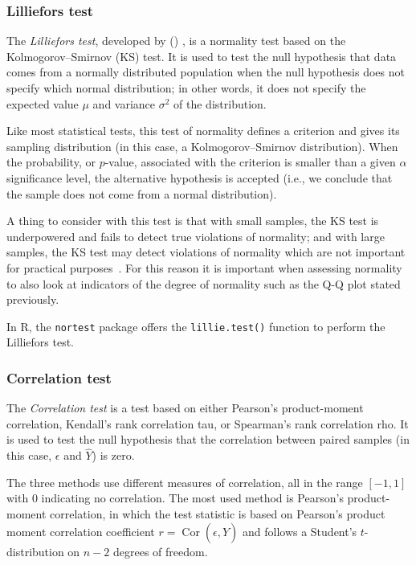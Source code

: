 \subsubsection{Lilliefors test}\label{sec:diag-lillie}
The \emph{Lilliefors test}, developed by \citeauthor{Lilliefors1967} (\citeyear{Lilliefors1967}) \cite{Lilliefors1967}, is  a normality test based on the Kolmogorov--Smirnov (KS) test. It is used to test the null hypothesis that data comes from a normally distributed population when the null hypothesis does not specify which normal distribution; in other words, it does not specify the expected value $\mu$ and variance $\sigma^{2}$ of the distribution.

Like most statistical tests, this test of normality defines a criterion and gives its sampling distribution (in this case, a Kolmogorov--Smirnov distribution). When the probability, or $p$-value, associated with the criterion is smaller than a given $\alpha$ significance level, the alternative hypothesis is accepted (i.e., we conclude that the sample does not come from a normal distribution).

A thing to consider with this test is that with small samples, the KS test is underpowered and fails to detect true violations of normality; and with large samples, the KS test may detect violations of normality which are not important for practical purposes~\cite{Razali2010}. For this reason it is important when assessing normality to also look at indicators of the degree of normality such as the Q-Q plot stated previously.

\medskip
In R, the \texttt{nortest} package offers the \texttt{lillie.test()} function to perform the Lilliefors test.

\subsubsection{Correlation test}\label{sec:diag-covtest}
The \emph{Correlation test} is a test based on either Pearson's product-moment correlation, Kendall's rank correlation tau, or Spearman's rank correlation rho. It is used to test the null hypothesis that the correlation between paired samples (in this case, $\epsilon$ and $\hat{Y}$) is zero.

The three methods use different measures of correlation, all in the range $[-1, 1]$ with $0$ indicating no correlation. The most used method is Pearson's product-moment correlation, in which the test statistic is based on Pearson's product moment correlation coefficient $r = \operatorname{Cor}(\epsilon, \hat{Y})$ and follows a Student's $t$-distribution on $n-2$ degrees of freedom.

